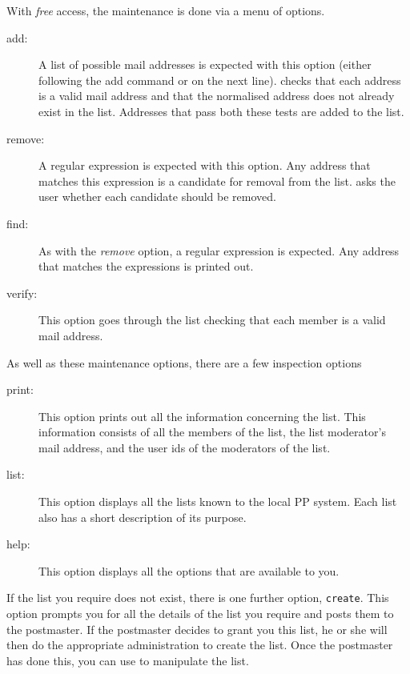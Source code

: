 With {\em free} access, the maintenance is done via a menu of options.
\begin{description}

\item [add:] A list of possible mail addresses is expected with this
option (either following the add command or on the next line).
 checks that each address is a valid mail address and
that the normalised address does not already exist in the list.
Addresses that pass both these tests are added to the list.

\item [remove:] A regular expression is expected with this option.
Any address that matches this expression is a candidate
for removal from the list.
 asks the user whether each candidate should be removed.

\item [find:] As with the {\em remove} option, a regular
expression is expected.
Any address that matches the expressions is printed out.

\item [verify:] This option goes through the list
checking that each member is a valid mail address.
\end{description}

As well as these maintenance options, there are a few inspection
options
\begin{description}

\item [print:] This option prints out all the information concerning
the list.
This information consists of  all the members of the list, the list
moderator's mail address, and the user ids of the moderators of the list.

\item [list:] This option displays all the lists known to the local PP system.
Each list also has a short description of its purpose.

\item [help:] This option displays all the options that are available
to you.

\end{description}

If the list you require does not exist, there is one further
option, {\tt create}.
This option prompts you for all the details of the list you require
and posts them to the postmaster.
If the postmaster decides to grant you this list, he or she will then
do the appropriate administration to create the list.
Once the postmaster has done this, you can use  to
manipulate the list.

